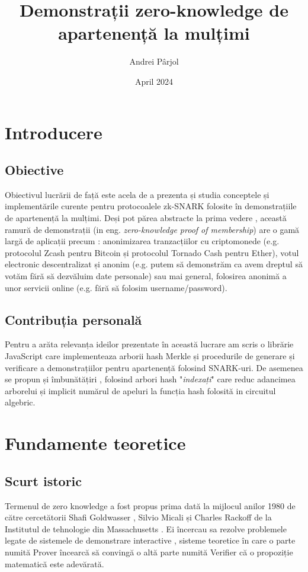 \documentclass[12pt, letterpaper]{article}
\title{Demonstrații zero-knowledge de apartenență la mulțimi}
\author{Andrei Pârjol}
\date{April 2024}
\begin{document}
\maketitle

\newpage
\tableofcontents
\newpage

\section{Introducere}

\subsection{Obiective} Obiectivul lucrării de față este acela de a prezenta și studia conceptele și implementările curente pentru protocoalele zk-SNARK folosite în demonstrațiile de apartenență la mulțimi. Deși pot părea abstracte la prima vedere , această ramură de demonstrații (in eng. \emph{zero-knowledge proof of membership}) are o gamă largă de aplicații precum : anonimizarea tranzacțiilor cu criptomonede (e.g. protocolul Zcash pentru Bitcoin și protocolul Tornado Cash pentru Ether), votul electronic descentralizat și anonim (e.g. putem să demonstrăm ca avem dreptul să votăm fără să dezvăluim date personale) sau mai general, folosirea anonimă a unor servicii online (e.g. fără să folosim username/password).

\subsection{Contribuția personală}

Pentru a arăta relevanța ideilor prezentate în această lucrare am scris o librărie JavaScript care implementeaza arborii hash Merkle și procedurile de generare și verificare a demonstrațiilor pentru apartenență folosind SNARK-uri. De asemenea se propun și îmbunătățiri , folosind arbori hash "\emph{indexați}" care reduc adancimea arborelui și implicit numărul de apeluri la funcția hash folosită in circuitul algebric.

\pagebreak

\section{Fundamente teoretice}
\subsection{Scurt istoric}
\vspace{5mm}
    Termenul de zero knowledge a fost propus prima dată la mijlocul anilor 1980 de către cercetătorii  Shafi Goldwasser , Silvio Micali și Charles Rackoff de la Institutul de tehnologie din Massachusetts . Ei încercau sa rezolve problemele legate de sistemele de demonstrare interactive , sisteme teoretice în care o parte numită Prover încearcă să convingă o altă parte numită Verifier că o propoziție matematică este adevărată.
\end{document}
